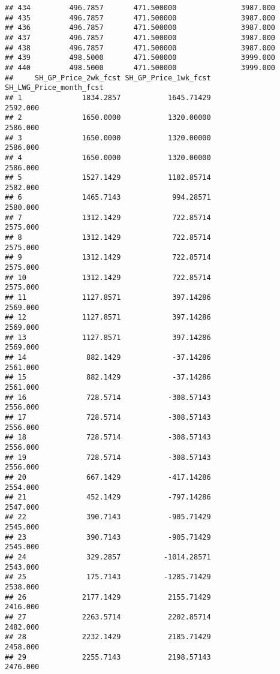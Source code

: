 \documentclass[]{article}
\begin{document}
\begin{verbatim}
## 434         496.7857       471.500000               3987.000
## 435         496.7857       471.500000               3987.000
## 436         496.7857       471.500000               3987.000
## 437         496.7857       471.500000               3987.000
## 438         496.7857       471.500000               3987.000
## 439         498.5000       471.500000               3999.000
## 440         498.5000       471.500000               3999.000
##     SH_GP_Price_2wk_fcst SH_GP_Price_1wk_fcst SH_LWG_Price_month_fcst
## 1              1834.2857           1645.71429                2592.000
## 2              1650.0000           1320.00000                2586.000
## 3              1650.0000           1320.00000                2586.000
## 4              1650.0000           1320.00000                2586.000
## 5              1527.1429           1102.85714                2582.000
## 6              1465.7143            994.28571                2580.000
## 7              1312.1429            722.85714                2575.000
## 8              1312.1429            722.85714                2575.000
## 9              1312.1429            722.85714                2575.000
## 10             1312.1429            722.85714                2575.000
## 11             1127.8571            397.14286                2569.000
## 12             1127.8571            397.14286                2569.000
## 13             1127.8571            397.14286                2569.000
## 14              882.1429            -37.14286                2561.000
## 15              882.1429            -37.14286                2561.000
## 16              728.5714           -308.57143                2556.000
## 17              728.5714           -308.57143                2556.000
## 18              728.5714           -308.57143                2556.000
## 19              728.5714           -308.57143                2556.000
## 20              667.1429           -417.14286                2554.000
## 21              452.1429           -797.14286                2547.000
## 22              390.7143           -905.71429                2545.000
## 23              390.7143           -905.71429                2545.000
## 24              329.2857          -1014.28571                2543.000
## 25              175.7143          -1285.71429                2538.000
## 26             2177.1429           2155.71429                2416.000
## 27             2263.5714           2202.85714                2482.000
## 28             2232.1429           2185.71429                2458.000
## 29             2255.7143           2198.57143                2476.000

\end{verbatim}
\end{document}
